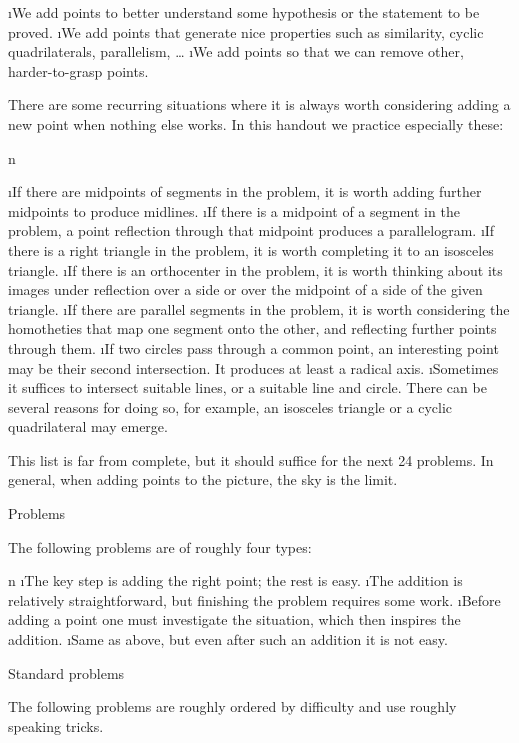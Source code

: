 \begitems
\i We add points to better understand some hypothesis or the statement to be proved.
\i We add points that generate nice properties such as similarity, cyclic quadrilaterals, parallelism, \dots
\i We add points so that we can remove other, harder-to-grasp points.
\enditems

There are some recurring situations where it is always worth considering adding a new point when nothing else works. In this handout we practice especially these:

\begitems \style n

\i If there are midpoints of segments in the problem, it is worth adding further midpoints to produce midlines.
\i If there is a midpoint of a segment in the problem, a point reflection through that midpoint produces a parallelogram.
\i If there is a right triangle in the problem, it is worth completing it to an isosceles triangle.
\i If there is an orthocenter in the problem, it is worth thinking about its images under reflection over a side or over the midpoint of a side of the given triangle.
\i If there are parallel segments in the problem, it is worth considering the homotheties that map one segment onto the other, and reflecting further points through them.
\i If two circles pass through a common point, an interesting point may be their second intersection. It produces at least a radical axis.
\i Sometimes it suffices to intersect suitable lines, or a suitable line and circle. There can be several reasons for doing so, for example, an isosceles triangle or a cyclic quadrilateral may emerge.

\enditems

This list is far from complete, but it should suffice for the next 24 problems. In general, when adding points to the picture, the sky is the limit.

\sec Problems

The following problems are of roughly four types:

\begitems \style n
\i The key step is adding the right point; the rest is easy.
\i The addition is relatively straightforward, but finishing the problem requires some work.
\i Before adding a point one must investigate the situation, which then inspires the addition.
\i Same as above, but even after such an addition it is not easy.
\enditems

\secc Standard problems

The following problems are roughly ordered by difficulty and use roughly speaking  tricks.

